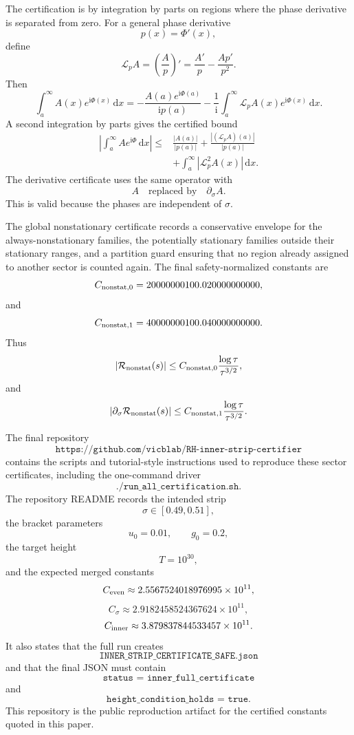 \documentclass[11pt]{article}
\newcommand{\ii}{\mathrm{i}}
\newcommand{\dd}{\mathrm{d}}
\newcommand{\s}{s}
\newcommand{\sig}{\sigma}
\newcommand{\tauh}{\tau}
\newcommand{\Rnonstat}{\mathcal R_{\rm nonstat}}
\newcommand{\JSON}[1]{\texttt{#1}}
\newcommand{\code}[1]{\texttt{#1}}
\begin{document}
The certification is by integration by parts on regions where the phase
derivative is separated from zero.  For a general phase derivative
\[
        p(x)=\Phi'(x),
\]
define
\[
        \mathcal L_p A
        =
        \left(\frac{A}{p}\right)'
        =
        \frac{A'}{p}
        -
        \frac{A p'}{p^2}.
\]
Then
\[
        \int_a^\infty A(x)e^{\ii\Phi(x)}\,\dd x
        =
        -\frac{A(a)e^{\ii\Phi(a)}}{\ii p(a)}
        -
        \frac{1}{\ii}
        \int_a^\infty
        \mathcal L_pA(x)e^{\ii\Phi(x)}
        \,\dd x.
\]
A second integration by parts gives the certified bound
\[
\begin{aligned}
        \left|
        \int_a^\infty A e^{\ii\Phi}\,\dd x
        \right|
        \le
        &
        \frac{|A(a)|}{|p(a)|}
        +
        \frac{|(\mathcal L_pA)(a)|}{|p(a)|}
        \\
        &+
        \int_a^\infty
        |\mathcal L_p^2A(x)|
        \,\dd x.
\end{aligned}
\]
The derivative certificate uses the same operator with
\[
        A
        \quad\text{replaced by}\quad
        \partial_\sig A.
\]
This is valid because the phases are independent of \(\sig\).

The global nonstationary certificate records a conservative envelope for the
always-nonstationary families, the potentially stationary families outside
their stationary ranges, and a partition guard ensuring that no region already
assigned to another sector is counted again.  The final safety-normalized constants are
\[
        C_{{\rm nonstat},0}
        =
        20000000100.020000000000,
\]
and
\[
        C_{{\rm nonstat},1}
        =
        40000000100.040000000000.
\]
Thus
\[
        |\Rnonstat(\s)|
        \le
        C_{{\rm nonstat},0}
        \frac{\log\tauh}{\tauh^{3/2}},
\]
and
\[
        |\partial_\sig\Rnonstat(\s)|
        \le
        C_{{\rm nonstat},1}
        \frac{\log\tauh}{\tauh^{3/2}}.
\]

The final repository
\[
        \texttt{https://github.com/vicblab/RH-inner-strip-certifier}
\]
contains the scripts and tutorial-style instructions used to reproduce these
sector certificates, including the one-command driver
\[
        \code{./run\_all\_certification.sh}.
\]
The repository README records the intended strip
\[
        \sig\in[0.49,0.51],
\]
the bracket parameters
\[
        u_0=0.01,
        \qquad
        g_0=0.2,
\]
the target height
\[
        T=10^{30},
\]
and the expected merged constants
\[
        C_{\rm even}\approx2.5567524018976995\times10^{11},
\]
\[
        C_{\sig}\approx2.9182458524367624\times10^{11},
\]
\[
        C_{\rm inner}\approx3.879837844533457\times10^{11}.
\]
It also states that the full run creates
\[
        \code{INNER\_STRIP\_CERTIFICATE\_SAFE.json}
\]
and that the final JSON must contain
\[
        \JSON{status = inner\_full\_certificate}
\]
and
\[
        \JSON{height\_condition\_holds = true}.
\]
This repository is the public reproduction artifact for the certified
constants quoted in this paper. \cite{InnerRepo}
\end{document}
